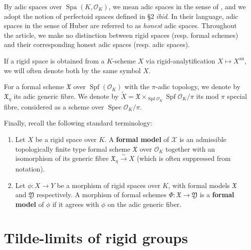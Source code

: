 \documentclass[10pt,oneside]{amsart}
\theoremstyle{definition}
\begin{document}
	By adic spaces over $\operatorname{Spa}(K,\mathcal O_K)$, we mean adic spaces in the sense of \cite{SW}, and we adopt the notion of perfectoid spaces defined in \S2 \textit{\small ibid}. In their language, adic spaces in the sense of Huber are referred to as \textit{honest} adic spaces. Throughout the article, we make no distinction between rigid spaces (resp. formal schemes) and their corresponding honest adic spaces (resp. adic spaces). 
	
	If a rigid space is obtained from a $K$-scheme $X$ via rigid-analytification $X\mapsto X^{\operatorname{an}}$, we will often denote both by the same symbol $X$.
 
	For a formal scheme $\mathfrak X$ over $\operatorname{Spf}(\mathcal O_K)$ with the $\pi$-adic topology, we denote by $\mathfrak X_\eta$ its adic generic fibre. 
	We denote by $\tilde{X}=\mathfrak X\times_{\operatorname{Spf}\mathcal O_K}\operatorname{Spf}\mathcal O_K/\pi$ its mod $\pi$ special fibre, considered as a scheme over $\operatorname{Spec}\mathcal O_K/\pi$. 

	Finally, recall the following standard terminology: 
		\begin{enumerate}
			\item Let $X$ be a rigid space over $K$. A \textbf{formal model} of $\mathcal X$ is an admissible topologically finite type formal scheme $\mathfrak X$ over $\mathcal O_K$ together with an isomorphism of its generic fibre $\mathfrak X_\eta \xrightarrow{\sim} X$ (which is often suppressed from notation).
			\item Let $\phi:  X\rightarrow  Y$ be a morphism of rigid spaces over $K$, with formal models $\mathfrak X$ and $\mathfrak Y$	respectively. A morphism of formal schemes $\Phi:\mathfrak X \rightarrow \mathfrak Y$ is a \textbf{formal model} of $\phi$ if it agrees with $\phi$ on the adic generic fiber. 
		\end{enumerate}


	
	\section{Tilde-limits of rigid groups} \label{section:tilde_limit}
  
\end{document}
